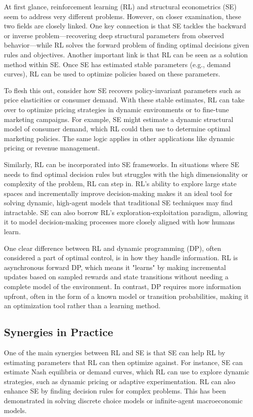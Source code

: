 
At first glance, reinforcement learning (RL) and structural econometrics (SE) seem to address very different problems. However, on closer examination, these two fields are closely linked. One key connection is that SE tackles the backward or inverse problem—recovering deep structural parameters from observed behavior—while RL solves the forward problem of finding optimal decisions given rules and objectives. Another important link is that RL can be seen as a solution method within SE. Once SE has estimated stable parameters (e.g., demand curves), RL can be used to optimize policies based on these parameters.

To flesh this out, consider how SE recovers policy-invariant parameters such as price elasticities or consumer demand. With these stable estimates, RL can take over to optimize pricing strategies in dynamic environments or to fine-tune marketing campaigns. For example, SE might estimate a dynamic structural model of consumer demand, which RL could then use to determine optimal marketing policies. The same logic applies in other applications like dynamic pricing or revenue management.

Similarly, RL can be incorporated into SE frameworks. In situations where SE needs to find optimal decision rules but struggles with the high dimensionality or complexity of the problem, RL can step in. RL’s ability to explore large state spaces and incrementally improve decision-making makes it an ideal tool for solving dynamic, high-agent models that traditional SE techniques may find intractable. SE can also borrow RL’s exploration-exploitation paradigm, allowing it to model decision-making processes more closely aligned with how humans learn.

One clear difference between RL and dynamic programming (DP), often considered a part of optimal control, is in how they handle information. RL is asynchronous forward DP, which means it "learns" by making incremental updates based on sampled rewards and state transitions without needing a complete model of the environment. In contrast, DP requires more information upfront, often in the form of a known model or transition probabilities, making it an optimization tool rather than a learning method.

\subsection{Synergies in Practice}

One of the main synergies between RL and SE is that SE can help RL by estimating parameters that RL can then optimize against. For instance, SE can estimate Nash equilibria or demand curves, which RL can use to explore dynamic strategies, such as dynamic pricing or adaptive experimentation. RL can also enhance SE by finding decision rules for complex problems. This has been demonstrated in solving discrete choice models or infinite-agent macroeconomic models.

